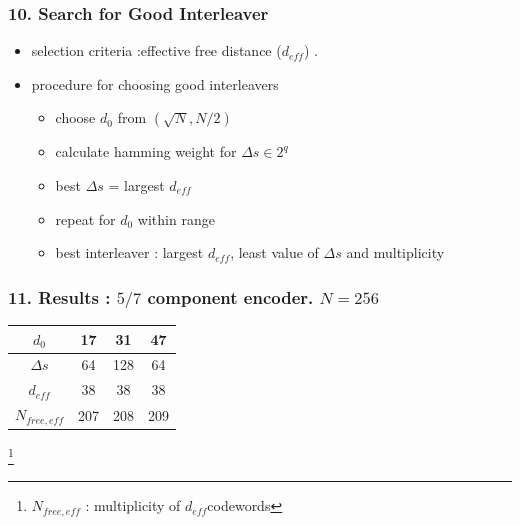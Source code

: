 \documentclass{beamer}  %
\newcommand\blfootnote[1]{%
  \begingroup
  \renewcommand\thefootnote{}\footnote{#1}%
  \addtocounter{footnote}{-1}%
  \endgroup
}
\begin{document}
\begin{frame}
\frametitle{10. Search for Good Interleaver}

\begin{itemize}
\setlength\itemsep{2em}
\item selection criteria :effective free distance ($d_{eff}$) .

\item procedure for choosing good interleavers

\begin{itemize}
\item choose $d_0$ from $(\sqrt{N},N/2)$

\item calculate hamming weight for  $\Delta s \in 2^q$



\item best $\Delta s$ = largest $d_{eff}$



\item repeat for $d_0$ within range 

\item best interleaver : largest $d_{eff}$, least value of $\Delta s$ and multiplicity
\end{itemize}



\end{itemize}

\end{frame}

\begin{frame}
\frametitle{11. Results : $5/7$ component encoder. $N=256$}
\begin{table}[h!]
\centering
\begin{tabular}{||c |c |c |c||} 
 \hline
 $d_0$ & 17 & 31 & 47 \\ [0.5ex] 
 \hline\hline
 $\Delta s$ & 64 & 128 & 64 \\ 
 \hline
  $d_{eff}$ & 38 & 38 & 38 \\ 
  \hline
  $N_{free, eff}$ & 207 & 208 & 209 \\ [1ex] 
 \hline
\end{tabular}
\label{tab1}
\end{table}
\blfootnote{ $N_{free, eff}$ : multiplicity of $d_{eff} $codewords}
\end{frame}
\end{document}
